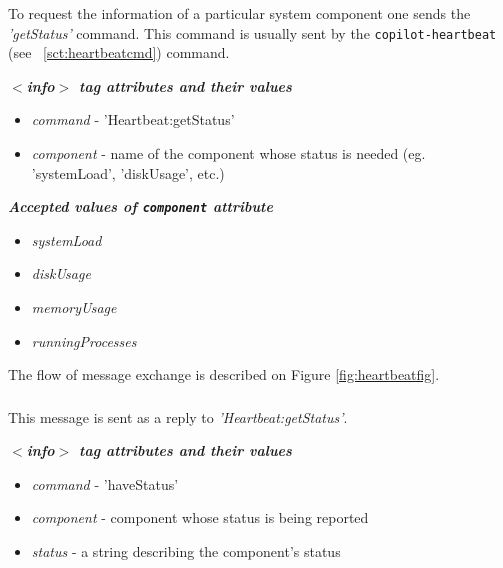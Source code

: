 \subsubsection{}
\label{sct:heartbeatgetstatus}

To request the information of a particular system component one sends the \emph{'getStatus'} command. This command is usually sent by the \texttt{copilot-heartbeat} (see ~\ref{sct:heartbeatcmd}) command.

\emph{\bf $<$info$>$ tag attributes and their values}
\begin{itemize}
  \item \emph{command} - 'Heartbeat:getStatus'
  \item \emph{component} - name of the component whose status is needed (eg. 'systemLoad', 'diskUsage', etc.)
\end{itemize}

\emph{\bf Accepted values of \texttt{component} attribute}
\begin{itemize}
  \item \emph{systemLoad}
  \item \emph{diskUsage}
  \item \emph{memoryUsage}
  \item \emph{runningProcesses}
\end{itemize}

The flow of message exchange is described on Figure \ref{fig:heartbeatfig}.

\subsubsection{}
\label{sct:heartbeathavestatus}
This message is sent as a reply to \emph{'Heartbeat:getStatus'}.

\emph{\bf $<$info$>$ tag attributes and their values}
\begin{itemize}
  \item \emph{command} - 'haveStatus'
  \item \emph{component} - component whose status is being reported
  \item \emph{status} - a string describing the component's status
\end{itemize}


\subsubsection{}
\label{sct:heartbeatping}

